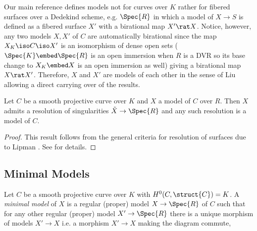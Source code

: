 \begin{rmk}
Our main reference \cite[Chapter 9]{liu} defines models not for curves over $K$ rather for fibered surfaces over a Dedekind scheme, e.g. $\Spec{R}$ in which a model of $X \to S$ is defined as a fibered surface $X'$ with a birational map $X' \rat X$. Notice, however, any two models $X, X'$ of $C$ are automatically birational since the map $X_K \iso C \iso X'$ is an isomorphism of dense open sets ($\Spec{K} \embed \Spec{R}$ is an open immersion when $R$ is a DVR so its base change to $X_K \embed X$ is an open immersion as well) giving a birational map $X \rat X'$. Therefore, $X$ and $X'$ are models of each other in the sense of Liu allowing a direct carrying over of the results. 
\end{rmk}

\begin{prop} \label{resolution_of_models}
Let $C$ be a smooth projective curve over $K$ and $X$ a model of $C$ over $R$. Then $X$ admits a resolution of singularities $\tilde{X} \to \Spec{R}$ and any such resolution is a model of $C$.
\end{prop}

\begin{proof}
This result follows from the general criteria for resolution of surfaces due to Lipman \cite{Lipman}. See \cite[\href{https://stacks.math.columbia.edu/tag/0C2U}{Tag 0C2U}]{stacks-project} for details.
\end{proof}

\subsection{Minimal Models} 


\renewcommand{\N}{\mathcal{N}}

\begin{defn}
Let $C$ be a smooth projective curve over $K$ with $H^0(C, \struct{C}) = K$. A \textit{minimal model} of $X$ is a regular (proper) model $X \to \Spec{R}$ of $C$ such that for any other regular (proper) model $X' \to \Spec{R}$ there is a unique morphism of models $X' \to X$ i.e. a morphism $X' \to X$ making the diagram commute,
\begin{center}
\end{center}
\end{defn}

